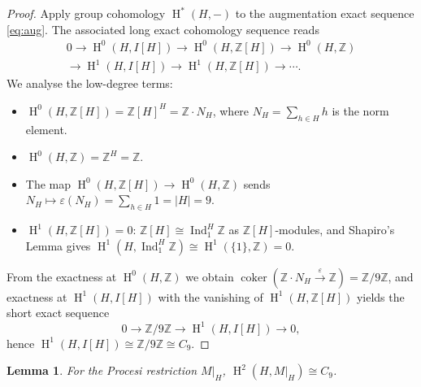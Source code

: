 \documentclass[12pt,a4paper]{article}
\newtheorem{lemma}[theorem]{Lemma}
\theoremstyle{definition}
\DeclareMathOperator{\coker}{coker}
\DeclareMathOperator{\Ind}{Ind}
\DeclareMathOperator{\coh}{H}
\begin{document}
\begin{proof}
Apply group cohomology \(\coh^*(H, -)\) to the augmentation exact sequence
\eqref{eq:aug}.
The associated long exact cohomology sequence reads
\begin{multline*}
0 \longrightarrow \coh^0(H, I[H]) \longrightarrow \coh^0(H, \mathbb{Z}[H])
\longrightarrow \coh^0(H, \mathbb{Z}) \\
\longrightarrow \coh^1(H, I[H])
\longrightarrow \coh^1(H, \mathbb{Z}[H]) \longrightarrow \cdots .
\end{multline*}
We analyse the low-degree terms:
\begin{itemize}
\item \(\coh^0(H, \mathbb{Z}[H]) = \mathbb{Z}[H]^H = \mathbb{Z}\!\cdot\! N_H\),
  where \(N_H = \sum_{h \in H} h\) is the norm element.
\item \(\coh^0(H, \mathbb{Z}) = \mathbb{Z}^H = \mathbb{Z}\).
\item The map \(\coh^0(H, \mathbb{Z}[H]) \to \coh^0(H, \mathbb{Z})\) sends
  \(N_H \mapsto \varepsilon(N_H) = \sum_{h \in H} 1 = |H| = 9\).
\item \(\coh^1(H, \mathbb{Z}[H]) = 0\): \(\mathbb{Z}[H] \cong \Ind_1^H
\mathbb{Z}\)
  as \(\mathbb{Z}[H]\)-modules, and Shapiro's Lemma
  \cite[Theorem~6.3.2]{Weibel1994} gives
  \(\coh^1(H, \Ind_1^H \mathbb{Z}) \cong \coh^1(\{1\}, \mathbb{Z}) = 0\).
\end{itemize}
From the exactness at \(\coh^0(H, \mathbb{Z})\) we obtain
\(\coker(\mathbb{Z}\!\cdot\!N_H \xrightarrow{\varepsilon} \mathbb{Z})
= \mathbb{Z}/9\mathbb{Z}\), and exactness at \(\coh^1(H, I[H])\) with the
vanishing of \(\coh^1(H, \mathbb{Z}[H])\) yields the short exact sequence
\[
0 \longrightarrow \mathbb{Z}/9\mathbb{Z} \longrightarrow \coh^1(H, I[H])
\longrightarrow 0,
\]
hence \(\coh^1(H, I[H]) \cong \mathbb{Z}/9\mathbb{Z} \cong C_9\).
\end{proof}

\begin{lemma}\label{lem:H2-MH}
For the Procesi restriction \(M|_H\),
\(\coh^2(H, M|_H) \cong C_9\).
\end{lemma}
\end{document}
